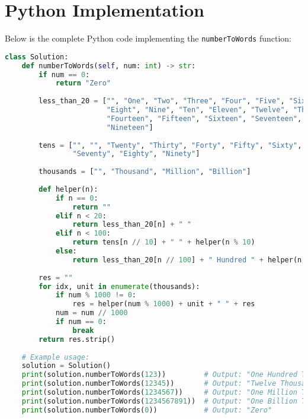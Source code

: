 \section*{Python Implementation}


Below is the complete Python code implementing the \texttt{numberToWords} function:

\begin{fullwidth}
\begin{lstlisting}[language=Python]
class Solution:
    def numberToWords(self, num: int) -> str:
        if num == 0:
            return "Zero"
        
        less_than_20 = ["", "One", "Two", "Three", "Four", "Five", "Six", "Seven",
                        "Eight", "Nine", "Ten", "Eleven", "Twelve", "Thirteen",
                        "Fourteen", "Fifteen", "Sixteen", "Seventeen", "Eighteen",
                        "Nineteen"]
        
        tens = ["", "", "Twenty", "Thirty", "Forty", "Fifty", "Sixty",
                "Seventy", "Eighty", "Ninety"]
        
        thousands = ["", "Thousand", "Million", "Billion"]
        
        def helper(n):
            if n == 0:
                return ""
            elif n < 20:
                return less_than_20[n] + " "
            elif n < 100:
                return tens[n // 10] + " " + helper(n % 10)
            else:
                return less_than_20[n // 100] + " Hundred " + helper(n % 100)
        
        res = ""
        for idx, unit in enumerate(thousands):
            if num % 1000 != 0:
                res = helper(num % 1000) + unit + " " + res
            num = num // 1000
            if num == 0:
                break
        return res.strip()
    
    # Example usage:
    solution = Solution()
    print(solution.numberToWords(123))         # Output: "One Hundred Twenty Three"
    print(solution.numberToWords(12345))       # Output: "Twelve Thousand Three Hundred Forty Five"
    print(solution.numberToWords(1234567))     # Output: "One Million Two Hundred Thirty Four Thousand Five Hundred Sixty Seven"
    print(solution.numberToWords(1234567891))  # Output: "One Billion Two Hundred Thirty Four Million Five Hundred Sixty Seven Thousand Eight Hundred Ninety One"
    print(solution.numberToWords(0))           # Output: "Zero"
\end{lstlisting}
\end{fullwidth}

